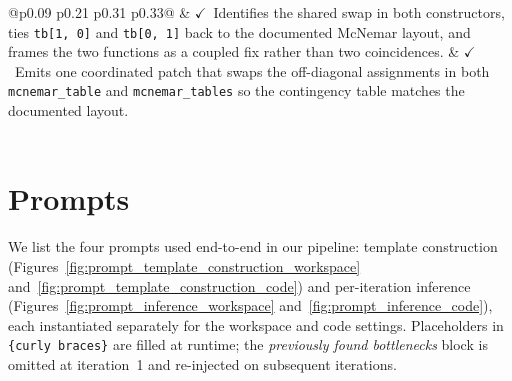 \documentclass{llmxive}
\begin{document}
\begin{table}[t]
\begin{tabular}{@{}p{0.09\linewidth} p{0.21\linewidth} p{0.31\linewidth} p{0.33\linewidth}@{}}
& $\checkmark$\ Identifies the shared swap in both constructors, ties \texttt{tb[1, 0]} and \texttt{tb[0, 1]} back to the documented McNemar layout, and frames the two functions as a coupled fix rather than two coincidences.
& $\checkmark$\ Emits one coordinated patch that swaps the off-diagonal assignments in both \texttt{mcnemar\_table} and \texttt{mcnemar\_tables} so the contingency table matches the documented layout.
\\
\midrule
{} \\
\bottomrule
\end{tabular}
\vspace{-0.05in}
\caption{Case study from the software-repository setting (\textit{mlxtend}, a multi-function bug in the McNemar contingency-table constructors). Rows are the three methods (Gold, \textsc{Single-Agent}, \textsc{TIDE}) and columns are the three sub-tasks (retrieval, identification, resolution). $\checkmark$ marks a sub-task the method handles correctly; $\times$ marks a wrong or missing one. The shaded row at the bottom shows the thought template that \textsc{TIDE} retrieved for this prediction.}
\label{tab:case_study_repo}
\end{table}


\section{Prompts}
\label{appen:prompts}

We list the four prompts used end-to-end in our pipeline: template construction (Figures~\ref{fig:prompt_template_construction_workspace} and~\ref{fig:prompt_template_construction_code}) and per-iteration inference (Figures~\ref{fig:prompt_inference_workspace} and~\ref{fig:prompt_inference_code}), each instantiated separately for the workspace and code settings. Placeholders in \texttt{\{curly braces\}} are filled at runtime; the \emph{previously found bottlenecks} block is omitted at iteration~1 and re-injected on subsequent iterations.
\end{document}
